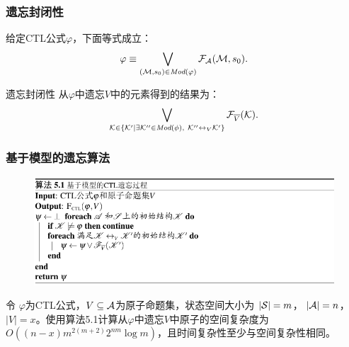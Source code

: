 \documentclass[aspectratio=1610, 9pt, CJK]{beamer}
\begin{document}
\begin{frame}
	\frametitle{遗忘封闭性}
	{\footnotesize 
		\begin{lemma}\label{lem:models:formula}
			给定CTL公式$\varphi$，下面等式成立：
			\begin{equation*}
				\varphi\equiv \bigvee_{({\cal M}, s_0)\in\textit{Mod}(\varphi)}{\cal F}_{\cal A}({\cal M}, s_0).
			\end{equation*}
		\end{lemma}
		\begin{block}{遗忘封闭性}
			从$\varphi$中遗忘$V$中的元素得到的结果为：
			\begin{equation*}
				\bigvee_{{\cal K}\in  \{{\cal K}'\mid \exists {\cal K}''\in\textit{Mod}(\phi),\ {\cal K}''\leftrightarrow_V{\cal K}'\}} {\cal F}_{\overline V}({\cal K}).
			\end{equation*}
		\end{block}
	}
\end{frame}

\begin{frame}
	\frametitle{基于模型的遗忘算法}
	{\footnotesize 
		\begin{figure}
			\includegraphics[scale=0.45]{figures/model-basedAlg}
		\end{figure}
		
		\begin{proposition}\label{pro:time:alg1}
			令 $\varphi$为CTL公式，$V\subseteq {\cal A}$为原子命题集，状态空间大小为 $|{\cal S}|=m$， $|{\cal A}|=n$，$|V|=x$。使用算法5.1计算从$\varphi$中遗忘$V$中原子的空间复杂度为 $O((n-x)m^{2(m+2)}2^{nm}  \log m)$，且时间复杂性至少与空间复杂性相同。
		\end{proposition}
	}
\end{frame}
\end{document}
